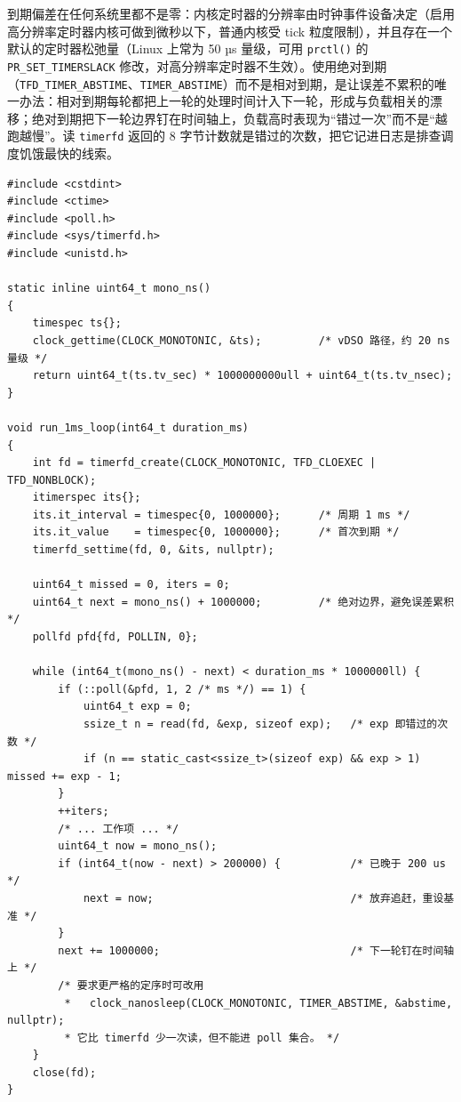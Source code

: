 \documentclass[12pt,a4paper,fontset=fandol]{ctexbook}
\newcommand{\Fn}[1]{\texttt{#1()}}
\newcommand{\Tp}[1]{\texttt{#1}}
\begin{document}
到期偏差在任何系统里都不是零：内核定时器的分辨率由时钟事件设备决定（启用高分辨率定时器内核可做到微秒以下，普通内核受 tick 粒度限制），并且存在一个默认的定时器松弛量（Linux 上常为 50 µs 量级，可用 \Fn{prctl} 的 \Tp{PR\_SET\_TIMERSLACK} 修改，对高分辨率定时器不生效）。使用绝对到期（\Tp{TFD\_TIMER\_ABSTIME}、\Tp{TIMER\_ABSTIME}）而不是相对到期，是让误差不累积的唯一办法：相对到期每轮都把上一轮的处理时间计入下一轮，形成与负载相关的漂移；绝对到期把下一轮边界钉在时间轴上，负载高时表现为``错过一次''而不是``越跑越慢''。读 \Tp{timerfd} 返回的 8 字节计数就是错过的次数，把它记进日志是排查调度饥饿最快的线索。

\begin{lstlisting}[style=cppstyle,caption={周期定时器回路：绝对到期、溢出计数与自校正},label={lst:ch02-timerfd}]
#include <cstdint>
#include <ctime>
#include <poll.h>
#include <sys/timerfd.h>
#include <unistd.h>

static inline uint64_t mono_ns()
{
    timespec ts{};
    clock_gettime(CLOCK_MONOTONIC, &ts);         /* vDSO 路径，约 20 ns 量级 */
    return uint64_t(ts.tv_sec) * 1000000000ull + uint64_t(ts.tv_nsec);
}

void run_1ms_loop(int64_t duration_ms)
{
    int fd = timerfd_create(CLOCK_MONOTONIC, TFD_CLOEXEC | TFD_NONBLOCK);
    itimerspec its{};
    its.it_interval = timespec{0, 1000000};      /* 周期 1 ms */
    its.it_value    = timespec{0, 1000000};      /* 首次到期 */
    timerfd_settime(fd, 0, &its, nullptr);

    uint64_t missed = 0, iters = 0;
    uint64_t next = mono_ns() + 1000000;         /* 绝对边界，避免误差累积 */
    pollfd pfd{fd, POLLIN, 0};

    while (int64_t(mono_ns() - next) < duration_ms * 1000000ll) {
        if (::poll(&pfd, 1, 2 /* ms */) == 1) {
            uint64_t exp = 0;
            ssize_t n = read(fd, &exp, sizeof exp);   /* exp 即错过的次数 */
            if (n == static_cast<ssize_t>(sizeof exp) && exp > 1) missed += exp - 1;
        }
        ++iters;
        /* ... 工作项 ... */
        uint64_t now = mono_ns();
        if (int64_t(now - next) > 200000) {           /* 已晚于 200 us */
            next = now;                               /* 放弃追赶，重设基准 */
        }
        next += 1000000;                              /* 下一轮钉在时间轴上 */
        /* 要求更严格的定序时可改用
         *   clock_nanosleep(CLOCK_MONOTONIC, TIMER_ABSTIME, &abstime, nullptr);
         * 它比 timerfd 少一次读，但不能进 poll 集合。 */
    }
    close(fd);
}
\end{lstlisting}
\end{document}
